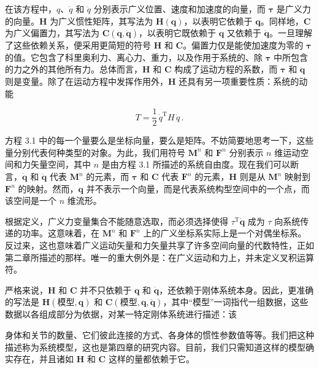 \documentclass[10pt,a4paper]{book}
\theoremstyle{thmstyle} %
\theoremstyle{defstyle} %
\theoremstyle{prostyle} %
\begin{document}
在该方程中，$q$、$\dot{q}$ 和 $\ddot{q}$ 分别表示广义位置、速度和加速度的向量，而 $\boldsymbol{\tau}$ 是广义力的向量。$\boldsymbol{H}$ 为广义惯性矩阵，其写法为 $\boldsymbol{H}(\boldsymbol{q})$，以表明它依赖于 $\boldsymbol{q}$。同样地，$\boldsymbol{C}$ 为广义偏置力，其写法为 $\boldsymbol{C}(\boldsymbol{q},\dot{\boldsymbol{q}})$，以表明它既依赖于 $\boldsymbol{q}$ 又依赖于 $\dot{\boldsymbol{q}}$。一旦理解了这些依赖关系，便采用更简短的符号 $\boldsymbol{H}$ 和 $\boldsymbol{C}$。偏置力仅是能使加速度为零的 $\boldsymbol{\tau}$ 的值。它包含了科里奥利力、离心力、重力，以及作用于系统的、除 $\boldsymbol{\tau}$ 中所包含的力之外的其他所有力。总体而言，$\boldsymbol{H}$ 和 $\boldsymbol{C}$ 构成了运动方程的系数，而 $\boldsymbol{\tau}$ 和 $\ddot{\boldsymbol{q}}$ 则是变量。除了在运动方程中发挥作用外，$\boldsymbol{H}$ 还具有另一项重要性质：系统的动能



$$
T = \frac { 1 } { 2 } \, \dot { q } ^{\mathrm { T} } H \, \dot { q } \, .
$$



方程 3.1 中的每一个量要么是坐标向量，要么是矩阵。不妨简要地思考一下，这些量分别代表何种类型的对象。为此，我们用符号 $\mathbf{M}^{n}$ 和 $\mathbf{F}^{n}$ 分别表示 $n$ 维运动空间和力矢量空间，其中 $n$ 是由方程 3.1 所描述的系统自由度。现在我们可以断言，$\dot{\mathbf{q}}$ 和 $\ddot{\mathbf{q}}$ 代表 $\mathbf{M}^{n}$ 的元素，而 $\boldsymbol{\tau}$ 和 $\mathbf{C}$ 代表 $\mathbf{F}^{n}$ 的元素，$\boldsymbol{H}$ 则是从 $\mathbf{M}^{n}$ 映射到 $\mathbf{F}^{n}$ 的映射。然而，$\mathbf{q}$ 并不表示一个向量，而是代表系统构型空间中的一个点，而该空间是一个 $n$ 维流形。



根据定义，广义力变量集合不能随意选取，而必须选择使得 $\tau^{\mathrm{T}}\dot{\boldsymbol{q}}$ 成为 $\tau$ 向系统传递的功率。这意味着，在 $\mathbf{M}^{n}$ 和 $\mathbf{F}^{n}$ 上的广义坐标系实际上是一个对偶坐标系。反过来，这也意味着广义运动矢量和力矢量共享了许多空间向量的代数特性，正如第二章所描述的那样。唯一的重大例外是：在广义运动和力上，并未定义叉积运算符。



严格来说，$\boldsymbol{H}$ 和 $\boldsymbol{C}$ 并不只依赖于 $\boldsymbol{q}$ 和 $\dot{\boldsymbol{q}}$，还依赖于刚体系统本身。因此，更准确的写法是 $\boldsymbol{H}(模型, \boldsymbol{q})$ 和 $\boldsymbol{C}(模型, \boldsymbol{q}, \dot{\boldsymbol{q}})$，其中“模型”一词指代一组数据，这些数据以各组成部分为依据，对某一特定刚体系统进行描述：该



身体和关节的数量、它们彼此连接的方式、各身体的惯性参数值等等。我们把这种描述称为系统模型，这也是第四章的研究内容。目前，我们只需知道这样的模型确实存在，并且诸如 $\mathbf{H}$ 和 $\mathbf{C}$ 这样的量都依赖于它。
\end{document}
